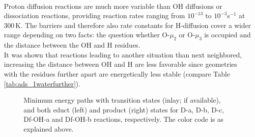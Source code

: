 \documentclass[11pt,DIV=13,BCOR=5mm,a4paper,headinclude]{scrbook}
\begin{document}
\\
Proton diffusion reactions are much more variable than OH diffusions or dissociation reactions, providing reaction rates ranging from $10^{-13}$ to $10^{-3}$s$^{-1}$ at $300\,$K.
The barriers and therefore also rate constants for H-diffusion cover a wider range depending on two facts: the question whether O-$\mu_2$ or O-$\mu_3$ is occupied and the distance between the OH and H residues.
\\
It was shown that reactions leading to another situation than next neighbored, increasing the distance between OH and H are less favorable since geometries with the residues further apart are energetically less stable (compare Table \ref{tab:ads_1waterfurther}).
\begin{figure} [!ht]
\centering
{}
         \quad
{}
 \quad
{}
 \quad
{}
\caption{Minimum energy paths with transition states (inlay; if available), and both educt (left) and product (right) states for D-a, D-b, D-c, Df-OH-a and Df-OH-b reactions, respectively.
The color code is as explained above.}
       \label{mep}
\end{figure}
\end{document}
